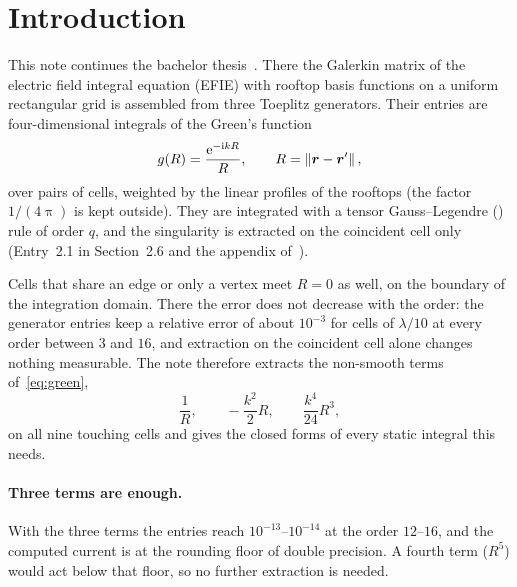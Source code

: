 \section{Introduction}
\label{sec:introduction}

This note continues the bachelor thesis~\cite{machacek2025method}. There the Galerkin matrix of the electric field
integral equation (\acs{EFIE}) with rooftop basis functions on a uniform rectangular grid is assembled from three Toeplitz
generators. Their entries are four-dimensional integrals of the Green's function
\begin{equation}
    \label{eq:green}
    g(R) = \frac{\mathrm{e}^{-\mathrm{i} k R}}{R}, \qquad R = \left\| \vb*{r}-\vb*{r}' \right\|,
\end{equation}
over pairs of cells, weighted by the linear profiles of the rooftops (the factor $1/(4\uppi)$ is kept outside). They
are integrated with a tensor Gauss--Legendre (\GL{}) rule of order $q$, and the singularity is extracted on the
coincident cell only (Entry~2.1 in Section~2.6 and the appendix of~\cite{machacek2025method}).

Cells that share an edge or only a vertex meet $R=0$ as well, on the boundary of the integration domain. There the \GL{}
error does not decrease with the order: the generator entries keep a relative error of about $10^{-3}$ for cells of
$\lambda/10$ at every order between $3$ and $16$, and extraction on the coincident cell alone changes nothing measurable.
The note therefore extracts the non-smooth terms of~\eqref{eq:green},
\begin{equation}
    \frac{1}{R},\qquad -\frac{k^2}{2}R,\qquad \frac{k^4}{24}R^3,
\end{equation}
on all nine touching cells and gives the closed forms of every static integral this needs.

\paragraph{Three terms are enough.} With the three terms the entries reach $10^{-13}$--$10^{-14}$ at the order $12$--$16$,
and the computed current is at the rounding floor of double precision. A fourth term ($R^5$) would act below that floor,
so no further extraction is needed.

